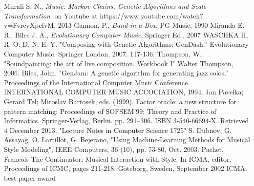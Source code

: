 \begin{thebibliography}{50}
   Murali S. N., \textsl{Music: Markov Chains, Genetic Algorithms and Scale Transformation}.
		on Youtube at https://www.youtube.com/watch?v=FvrcvXpcfvM, 2013
   Gannon, P., \textsl{Band-in-a-Box}. PG Music, 1990
   Miranda E. R., Biles J. A., \textsl{Evolutionary Computer Music}, Springer Ed., 2007
   WASCHKA II, R. O. D. N. E. Y. "Composing with Genetic Algorithms: GenDash." Evolutionary Computer Music. Springer London, 2007. 117-136.
   Thompson, W. "Soundpainting: the art of live composition. Workbook I" Walter Thompson, 2006.
   Biles, John. "GenJam: A genetic algorithm for generating jazz solos." Proceedings of the International Computer Music Conference. INTERNATIONAL COMPUTER MUSIC ACCOCIATION, 1994.
    Jan Pavelka; Gerard Tel; Miroslav Bartosek, eds. (1999). Factor oracle: a new structure for pattern matching; Proceedings of SOFSEM’99; Theory and Practice of Informatics. Springer-Verlag, Berlin. pp. 291–306. ISBN 3-540-66694-X. Retrieved 4 December 2013. "Lecture Notes in Computer Science 1725"
   S. Dubnov, G. Assayag, O. Lartillot, G. Bejerano, "Using Machine-Learning Methods for Musical Style Modeling", IEEE Computers, 36 (10), pp. 73-80, Oct. 2003.
   Pachet, Francois The Continuator: Musical Interaction with Style. In ICMA, editor, Proceedings of ICMC, pages 211-218, Göteborg, Sweden, September 2002 ICMA. best paper award 
  \end{thebibliography}
